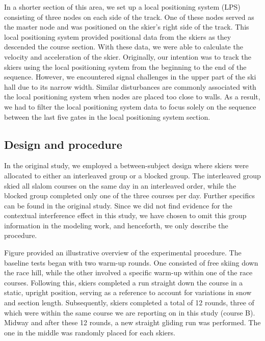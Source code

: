 \documentclass{article}
\begin{document}
In a shorter section of this area, we set up a local positioning system (LPS) consisting of three nodes on each side of the track. One of these nodes served as the master node and was positioned on the skier's right side of the track. This local positioning system provided positional data from the skiers as they descended the course section. With these data, we were able to calculate the velocity and acceleration of the skier. Originally, our intention was to track the skiers using the local positioning system from the beginning to the end of the sequence. However, we encountered signal challenges in the upper part of the ski hall due to its narrow width. Similar disturbances are commonly associated with the local positioning system when nodes are placed too close to walls. As a result, we had to filter the local positioning system data to focus solely on the sequence between the last five gates in the local positioning system section.

\subsection{Design and procedure}
In the original study, we employed a between-subject design where skiers were allocated to either an interleaved group or a blocked group. The interleaved group skied all slalom courses on the same day in an interleaved order, while the blocked group completed only one of the three courses per day. Further specifics can be found in the original study. Since we did not find evidence for the contextual interference effect in this study, we have chosen to omit this group information in the modeling work, and henceforth, we only describe the procedure.

Figure provided an illustrative overview of the experimental procedure. The baseline tests began with two warm-up rounds. One consisted of free skiing down the race hill, while the other involved a specific warm-up within one of the race courses. Following this, skiers completed a run straight down the course in a static, upright position, serving as a reference to account for variations in snow and section length. Subsequently, skiers completed a total of 12 rounds, three of which were within the same course we are reporting on in this study (course B). Midway and after these 12 rounds, a new straight gliding run was performed. The one in the middle was randomly placed for each skiers.

 
\end{document}
